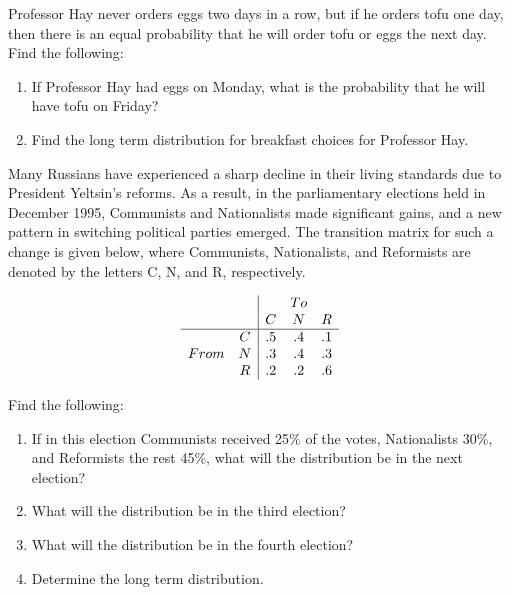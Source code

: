 \begin{puzzle}
    Professor Hay never orders eggs two days in a row, but if he orders tofu one day, then there is an equal probability that he will order tofu or eggs the next day. Find the following:
    \begin{enumerate}
        \item If Professor Hay had eggs on Monday, what is the probability that he will have tofu on Friday?
        \item Find the long term distribution for breakfast choices for Professor Hay.
    \end{enumerate}
\end{puzzle}



\begin{puzzle}
    Many Russians have experienced a sharp decline in their living standards due to President Yeltsin’s reforms. As a result, in the parliamentary elections held in December 1995, Communists and Nationalists made significant gains, and a new pattern in switching political parties emerged. The transition matrix for such a change is given below, where Communists, Nationalists, and Reformists are denoted by the letters C, N, and R, respectively.

    \[
        \begin{array}{lc|ccc}
                 &   &    & To &    \\
                 &   & C  & N  & R  \\
            \hline
                 & C & .5 & .4 & .1 \\
            From & N & .3 & .4 & .3 \\
                 & R & .2 & .2 & .6 \\
        \end{array}
    \]

    Find the following:
    \begin{enumerate}
        \item If in this election Communists received 25\% of the votes, Nationalists 30\%, and Reformists the rest 45\%, what will the distribution be in the next election?
        \item What will the distribution be in the third election?
        \item What will the distribution be in the fourth election?
        \item Determine the long term distribution.
    \end{enumerate}
\end{puzzle}
